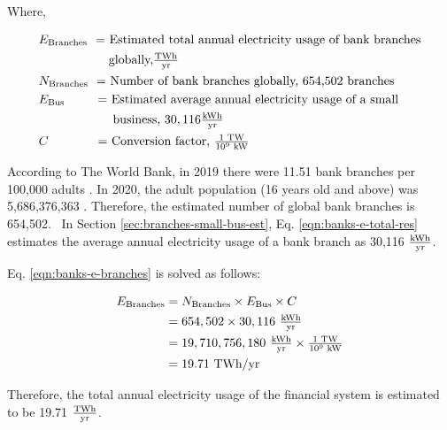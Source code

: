 Where,

\begin{align*}
  &E_\textrm{Branches} \textrm{ \     = Estimated total annual electricity usage of bank branches} \\
  &\textrm{ \qquad \qquad \quad \ globally,} \tfrac{ \textrm{{T}Wh} } { \textrm{yr} } \\
  &N_\textrm{Branches}  \textrm{ \    = Number of bank branches globally, 654,502 branches} \\
  &E_\textrm{Bus}  \textrm{ \qquad \  = Estimated average annual electricity usage of a small}  \\
  &\textrm{ \qquad \qquad \quad \ \ business, $30,116\tfrac{ \textrm{kWh} } { \textrm{yr} }$} \\
  &C \textrm{\qquad \quad \ \ \       = Conversion factor, $\tfrac{1 \textrm{ TW} } { 10^9 \textrm{ kW}}$}
\end{align*}

According to The World Bank, in 2019 there were 11.51 bank branches per 100,000 adults \cite{number-branches-atms}.
In 2020, the adult population (16 years old and above) was 5,686,376,363 \cite{pop}.
Therefore, the estimated number of global bank branches is 654,502. 
In Section \ref{sec:branches-small-bus-est}, Eq. \eqref{eqn:banks-e-total-res} estimates the average annual electricity usage of a bank branch as 30,116 $\tfrac{ \textrm{kWh} } { \textrm{yr} }$.

Eq. \eqref{eqn:banks-e-branches} is solved as follows:

\begin{align}\label{eqn:banks-e-res-branches}
  E_\textrm{Branches} &= N_\textrm{Branches} \times E_\textrm{Bus} \times C \nonumber\\
                      &= 654,502 \times 30,116 \ \tfrac{ \textrm{kWh} } { \textrm{yr} } \nonumber \\
                      &= 19,710,756,180 \ \tfrac{ \textrm{kWh} } { \textrm{yr} } \times \tfrac{1 \textrm{ TW} } { 10^9 \textrm{ kW}} \nonumber \\
                      &= 19.71 \textrm{ TWh/yr} 
\end{align}

Therefore, the total annual electricity usage of the financial system is estimated to be 19.71 $\tfrac{ \textrm{{T}Wh} } { \textrm{yr} }$.

